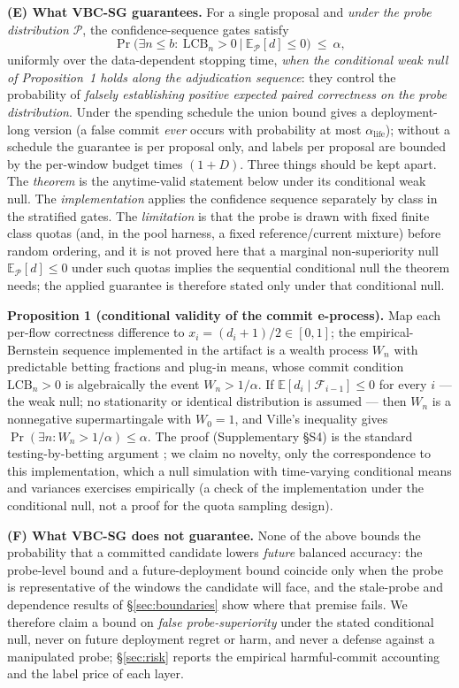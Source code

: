 \documentclass[journal]{IEEEtran}
\begin{document}
\textbf{(E) What VBC-SG guarantees.} For a single proposal and \emph{under the probe distribution} $\mathcal P$, the confidence-sequence gates satisfy
$$\Pr\!\big(\exists n\le b:\ \text{LCB}_n>0 \ \big|\ \mathbb E_{\mathcal P}[d]\le 0\big)\ \le\ \alpha ,$$
uniformly over the data-dependent stopping time, \emph{when the conditional weak null of Proposition~1 holds along the adjudication sequence}: they control the probability of \emph{falsely establishing positive expected paired correctness on the probe distribution}. Under the spending schedule the union bound gives a deployment-long version (a false commit \emph{ever} occurs with probability at most $\alpha_{\mathrm{life}}$); without a schedule the guarantee is per proposal only, and labels per proposal are bounded by the per-window budget times $(1+D)$. Three things should be kept apart. The \emph{theorem} is the anytime-valid statement below under its conditional weak null. The \emph{implementation} applies the confidence sequence separately by class in the stratified gates. The \emph{limitation} is that the probe is drawn with fixed finite class quotas (and, in the pool harness, a fixed reference/current mixture) before random ordering, and it is not proved here that a marginal non-superiority null $\mathbb E_{\mathcal P}[d]\le 0$ under such quotas implies the sequential conditional null the theorem needs; the applied guarantee is therefore stated only under that conditional null.

\textbf{Proposition 1 (conditional validity of the commit e-process).} Map each per-flow correctness difference to $x_i = (d_i+1)/2 \in [0,1]$; the empirical-Bernstein sequence implemented in the artifact is a wealth process $W_n$ with predictable betting fractions and plug-in means, whose commit condition $\mathrm{LCB}_n > 0$ is algebraically the event $W_n > 1/\alpha$. If $\mathbb{E}[d_i \mid \mathcal F_{i-1}] \le 0$ for every $i$ --- the weak null; no stationarity or identical distribution is assumed --- then $W_n$ is a nonnegative supermartingale with $W_0 = 1$, and Ville's inequality gives $\Pr(\exists n : W_n > 1/\alpha) \le \alpha$. The proof (Supplementary \S S4) is the standard testing-by-betting argument \cite{waudbysmith2023betting,howard2021timeuniform}; we claim no novelty, only the correspondence to this implementation, which a null simulation with time-varying conditional means and variances exercises empirically (a check of the implementation under the conditional null, not a proof for the quota sampling design).

\textbf{(F) What VBC-SG does not guarantee.} None of the above bounds the probability that a committed candidate lowers \emph{future} balanced accuracy: the probe-level bound and a future-deployment bound coincide only when the probe is representative of the windows the candidate will face, and the stale-probe and dependence results of \S\ref{sec:boundaries} show where that premise fails. We therefore claim a bound on \emph{false probe-superiority} under the stated conditional null, never on future deployment regret or harm, and never a defense against a manipulated probe; \S\ref{sec:risk} reports the empirical harmful-commit accounting and the label price of each layer.
\end{document}
